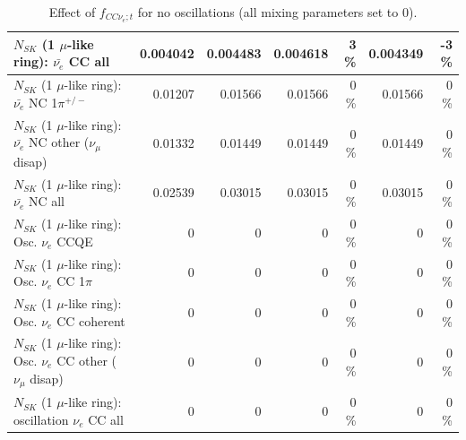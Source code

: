 \begin{table}
\begin{tabular}{| l | r | r | r  r | r  r |}
                            $N_{SK}$ (1 $\mu$-like ring): $\bar{\nu_{e}}$ CC all &        0.004042 &        0.004483 &        0.004618 &        3 \%  &        0.004349 &       -3 \%  \\ 
\hline
                     $N_{SK}$ (1 $\mu$-like ring): $\bar{\nu_e}$ NC 1$\pi^{+/-}$ &         0.01207 &         0.01566 &         0.01566 &        0 \%  &         0.01566 &        0 \%  \\ 
          $N_{SK}$ (1 $\mu$-like ring): $\bar{\nu_e}$ NC other ($\nu_\mu$ disap) &         0.01332 &         0.01449 &         0.01449 &        0 \%  &         0.01449 &        0 \%  \\ 
                            $N_{SK}$ (1 $\mu$-like ring): $\bar{\nu_{e}}$ NC all &         0.02539 &         0.03015 &         0.03015 &        0 \%  &         0.03015 &        0 \%  \\ 
\hline
\hline
\hline
                                 $N_{SK}$ (1 $\mu$-like ring): Osc. $\nu_e$ CCQE &               0 &               0 &               0 &        0 \%  &               0 &        0 \%  \\ 
                            $N_{SK}$ (1 $\mu$-like ring): Osc. $\nu_e$ CC 1$\pi$ &               0 &               0 &               0 &        0 \%  &               0 &        0 \%  \\ 
                          $N_{SK}$ (1 $\mu$-like ring): Osc. $\nu_e$ CC coherent &               0 &               0 &               0 &        0 \%  &               0 &        0 \%  \\ 
           $N_{SK}$ (1 $\mu$-like ring): Osc. $\nu_e$ CC other ($\nu_\mu$ disap) &               0 &               0 &               0 &        0 \%  &               0 &        0 \%  \\ 
                        $N_{SK}$ (1 $\mu$-like ring): oscillation $\nu_e$ CC all &               0 &               0 &               0 &        0 \%  &               0 &        0 \%  \\ 
\hline
\hline
\end{tabular}
\caption{ Effect of $f_{CC\nu_e; t}$ for no oscillations (all mixing parameters set to 0). }
\label{tab:num_xsec_norm_nuetonumu_1RmuT_3f_osc_t13:0}
\end{table}
\clearpage
